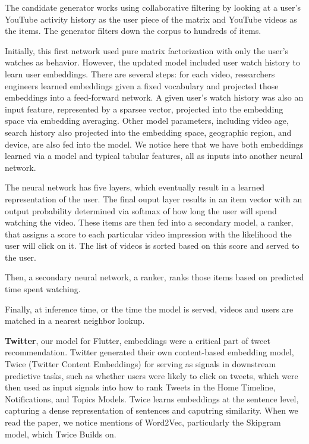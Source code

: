 \documentclass[11pt, table]{diazessay} %
\begin{document}
\begin{sloppypar}
The candidate generator works using collaborative filtering by looking at a user's YouTube activity history as the user piece of the matrix and YouTube videos as the items. The generator filters down the corpus to hundreds of items. 

Initially, this first network used pure matrix factorization with only the user's watches as behavior. However, the updated model included user watch history to learn user embeddings. There are several steps: for each video, researchers engineers learned embeddings given a fixed vocabulary and projected those embeddings into a feed-forward network. A given user's watch history was also an input feature, represented by a sparsee vector, projected into the embedding space via embedding averaging. Other model parameters, including video age, search history also projected into the embedding space, geographic region, and device, are also fed into the model. We notice here that we have both embeddings learned via a model and typical tabular features, all as inputs into another neural network.  

The neural network has five layers, which eventually result in a learned representation of the user. The final ouput layer results in an item vector with an output probability determined via softmax of how long the user will spend watching the video. These items are then fed into a secondary model, a ranker, that assigns a score to each particular video impression with the likelihood the user will click on it. The list of videos is sorted based on this score and served to the user. 

Then, a secondary neural network, a ranker, ranks those items based on predicted time spent watching. 

Finally, at inference time, or the time the model is served, videos and users are matched in a nearest neighbor lookup. 


\textbf{Twitter}, our model for Flutter, embeddings were a critical part of tweet recommendation. Twitter generated their own content-based embedding model, Twice (Twitter Content Embeddings)\citep{liu2022twice} for serving as signals in downstream predictive tasks, such as whether users were likely to click on tweets, which were then used as input signals into how to rank Tweets in the Home Timeline, Notifications, and Topics Models. Twice learns embeddings at the sentence level, capturing a dense representation of sentences and caputring similarity. When we read the paper, we notice mentions of Word2Vec, particularly the Skipgram model, which Twice Builds on. 


\end{sloppypar}
\end{document}

